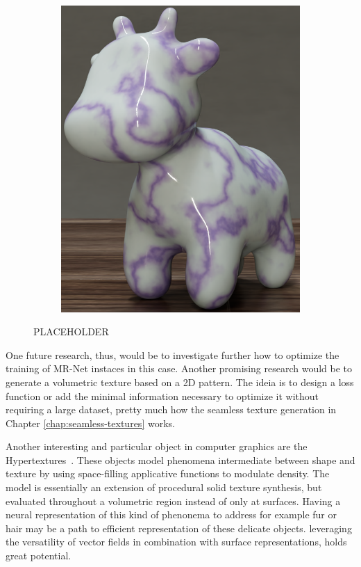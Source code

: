 \begin{figure}[h]
\begin{subfigure}[b]{0.32\textwidth}
       \includegraphics[width=\textwidth]{img/ch7/spot_mrnet.0101.png}
       \caption{}
   \end{subfigure}
   \caption{PLACEHOLDER}
   \label{f:volumetric-texture}
\end{figure}

One future research, thus, would be to investigate further how to optimize the training of MR-Net instaces in this case. Another promising research would be to generate a volumetric texture based on a 2D pattern. The ideia is to design a loss function or add the minimal information necessary to optimize it without requiring a large dataset, pretty much how the seamless texture generation in Chapter \ref{chap:seamless-textures} works.

Another interesting and particular object in computer graphics are the Hypertextures~\citep{hypertexture}. These objects model phenomena intermediate between shape and texture by using space-filling applicative functions to modulate density. The model is essentially an extension of procedural solid texture synthesis, but evaluated throughout a volumetric region instead of only at surfaces. Having a neural representation of this kind of phenonema to address for example fur or hair may be a path to efficient representation of these delicate objects. leveraging the versatility of vector fields in combination with surface representations, holds great potential.


